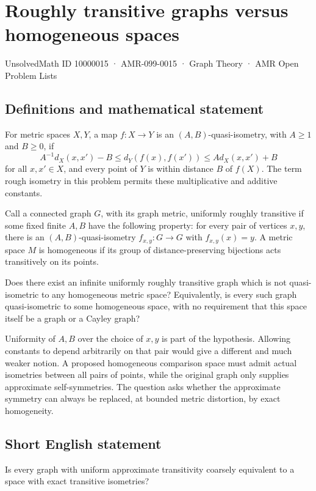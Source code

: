 \documentclass[11pt,a4paper]{article}
\begin{document}
\section*{Roughly transitive graphs versus homogeneous spaces}\label{10000015}
{\small UnsolvedMath ID 10000015 · AMR-099-0015 · Graph Theory · AMR Open Problem Lists}
\subsection{Definitions and mathematical statement}
For metric spaces $X,Y$, a map $f:X\to Y$ is an $(A,B)$-quasi-isometry, with $A\ge1$ and $B\ge0$, if
\[
A^{-1}d_X(x,x')-B\le d_Y(f(x),f(x'))\le A d_X(x,x')+B
\]
for all $x,x'\in X$, and every point of $Y$ is within distance $B$ of $f(X)$. The term rough isometry in this problem permits these multiplicative and additive constants.

Call a connected graph $G$, with its graph metric, uniformly roughly transitive if some fixed finite $A,B$ have the following property: for every pair of vertices $x,y$, there is an $(A,B)$-quasi-isometry $f_{x,y}:G\to G$ with $f_{x,y}(x)=y$. A metric space $M$ is homogeneous if its group of distance-preserving bijections acts transitively on its points.

Does there exist an infinite uniformly roughly transitive graph which is not quasi-isometric to any homogeneous metric space? Equivalently, is every such graph quasi-isometric to some homogeneous space, with no requirement that this space itself be a graph or a Cayley graph?

Uniformity of $A,B$ over the choice of $x,y$ is part of the hypothesis. Allowing constants to depend arbitrarily on that pair would give a different and much weaker notion. A proposed homogeneous comparison space must admit actual isometries between all pairs of points, while the original graph only supplies approximate self-symmetries. The question asks whether the approximate symmetry can always be replaced, at bounded metric distortion, by exact homogeneity.
\subsection{Short English statement}
Is every graph with uniform approximate transitivity coarsely equivalent to a space with exact transitive isometries?
\end{document}
